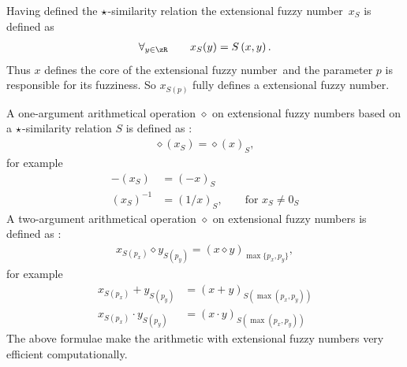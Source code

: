 \documentclass{amcs}
\DeclareMathOperator{\op}{\diamond}
\newcommand{\ksR}[3]{#1\left(#2,#3\right)}
\newcommand{\efn}{extensional fuzzy number}
\begin{document}
Having defined the $\operatorname*{\star}$-similarity relation the \efn\ $x_S$ is defined as 
\begin{align}
	\forall_{y\in\zR} \qquad x_S(y) = \ksR{S}{x}{y}.
\end{align}
Thus $x$ defines the core of the \efn\ and the parameter $p$ is responsible for its fuzziness. So $x_{S(p)}$ fully defines a \efn.

A one-argument arithmetical operation $\op$ on \efn s based on a $\operatorname*{\star}$-similarity relation $S$ is defined as \cite{id:Siminski2026Arithmetic}:
\begin{align}
	\op(x_{S}) = \op(x)_{S},
\end{align}
for example 
\begin{align}
	-\left(x_{S}\right) & = \left(-x\right)_{S} \\
	\left(x_{S}\right)^{-1} & = \left(1/x\right)_{S}, \qquad \text{for } x_S \neq 0_S
\end{align}
A two-argument arithmetical operation $\op$ on \efn s is defined as \cite{id:Siminski2026Arithmetic}:
\begin{align}
	x_{S(p_x)} \op y_{S(p_y)} = (x \op y)_{\max\{p_x,p_y\}},
\end{align}
for example
\begin{align}
	x_{S(p_x)} + y_{S(p_y)} & = (x+y)_{S(\max(p_x, p_y))} \\
	x_{S(p_x)} \cdot y_{S(p_y)} & = (x\cdot y)_{S(\max(p_x, p_y))} 
\end{align}
The above formulae make the arithmetic with \efn s very efficient computationally.

%
%
%
%
%
%
%
%
%
%
%
\end{document}
